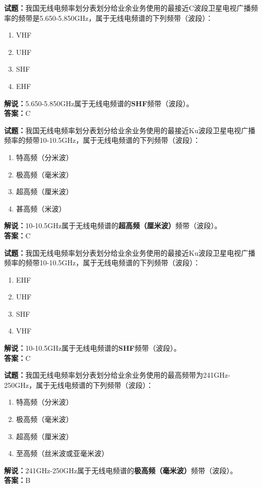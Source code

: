 \documentclass{ctexbook}
\begin{document}
\noindent\textbf{试题：}我国无线电频率划分表划分给业余业务使用的最接近C波段卫星电视广播频率的频带是5.650-5.850\unit{\GHz}，属于无线电频谱的下列频带（波段）：
\begin{enumerate}[leftmargin=3em]
  \item VHF
  \item UHF
  \item SHF
  \item EHF
\end{enumerate}
\noindent\textbf{解说：}5.650-5.850\unit{\GHz}属于无线电频谱的\textbf{SHF}频带（波段）。\\\noindent\textbf{答案：}C

\vspace{\baselineskip}

\noindent\textbf{试题：}我国无线电频率划分表划分给业余业务使用的最接近Ku波段卫星电视广播频率的频带10-10.5\unit{\GHz}，属于无线电频谱的下列频带（波段）：
\begin{enumerate}[leftmargin=3em]
  \item 特高频（分米波）
  \item 极高频（毫米波）
  \item 超高频（厘米波）
  \item 甚高频（米波）
\end{enumerate}
\noindent\textbf{解说：}10-10.5\unit{\GHz}属于无线电频谱的\textbf{超高频（厘米波）}频带（波段）。\\\noindent\textbf{答案：}C

\vspace{\baselineskip}

\noindent\textbf{试题：}我国无线电频率划分表划分给业余业务使用的最接近Ku波段卫星电视广播频率的频带10-10.5\unit{\GHz}，属于无线电频谱的下列频带（波段）：
\begin{enumerate}[leftmargin=3em]
  \item EHF
  \item UHF
  \item SHF
  \item VHF
\end{enumerate}
\noindent\textbf{解说：}10-10.5\unit{\GHz}属于无线电频谱的\textbf{SHF}频带（波段）。\\\noindent\textbf{答案：}C

\vspace{\baselineskip}

\noindent\textbf{试题：}我国无线电频率划分表划分给业余业务使用的最高频带为241\unit{\GHz}-250\unit{\GHz}，属于无线电频谱的下列频带（波段）：
\begin{enumerate}[leftmargin=3em]
  \item 特高频（分米波）
  \item 极高频（毫米波）
  \item 超高频（厘米波）
  \item 至高频（丝米波或亚毫米波）
\end{enumerate}
\noindent\textbf{解说：}241\unit{\GHz}-250\unit{\GHz}属于无线电频谱的\textbf{极高频（毫米波）}频带（波段）。\\\noindent\textbf{答案：}B
\end{document}

